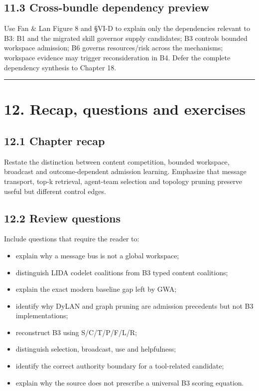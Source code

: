 \subsection{11.3 Cross-bundle dependency preview}\label{113-cross-bundle-dependency-preview}

Use Fan \& Lan Figure 8 and §VI-D to explain only the dependencies relevant to B3: B1 and the migrated skill governor supply candidates; B3 controls bounded workspace admission; B6 governs resources/risk across the mechanisms; workspace evidence may trigger reconsideration in B4. Defer the complete dependency synthesis to Chapter 18.

\begin{center}\rule{0.5\linewidth}{0.5pt}\end{center}

\section{12. Recap, questions and exercises}\label{12-recap-questions-and-exercises}

\subsection{12.1 Chapter recap}\label{121-chapter-recap}

Restate the distinction between content competition, bounded workspace, broadcast and outcome-dependent admission learning. Emphasize that message transport, top-k retrieval, agent-team selection and topology pruning preserve useful but different control edges.

\subsection{12.2 Review questions}\label{122-review-questions}

Include questions that require the reader to:

\begin{itemize}
\tightlist
\item
  explain why a message bus is not a global workspace;
\item
  distinguish LIDA codelet coalitions from B3 typed content coalitions;
\item
  explain the exact modern baseline gap left by GWA;
\item
  identify why DyLAN and graph pruning are admission precedents but not B3 implementations;
\item
  reconstruct B3 using S/C/T/P/F/L/R;
\item
  distinguish selection, broadcast, use and helpfulness;
\item
  identify the correct authority boundary for a tool-related candidate;
\item
  explain why the source does not prescribe a universal B3 scoring equation.
\end{itemize}

